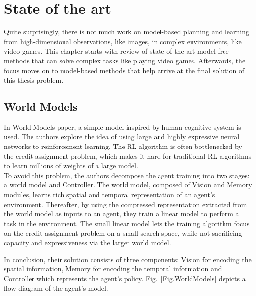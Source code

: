 \section{State of the art}

Quite surprisingly, there is not much work on model-based planning and learning from high-dimensional observations, like images, in complex environments, like video games. This chapter starts with review of state-of-the-art model-free methods that can solve complex tasks like playing video games. Afterwards, the focus moves on to model-based methods that help arrive at the final solution of this thesis problem.

\subsection{World Models} \label{Sec.WorldModels}

In World Models \cite{Algo.WorldModels} paper, a simple model inspired by human cognitive system is used. The authors explore the idea of using large and highly expressive neural networks to reinforcement learning. The RL algorithm is often bottlenecked by the credit assignment problem, which makes it hard for traditional RL algorithms to learn millions of weights of a large model. \\
To avoid this problem, the authors decompose the agent training into two stages: a world model and Controller. The world model, composed of Vision and Memory modules, learns rich spatial and temporal representation of an agent's environment. Thereafter, by using the compressed representation extracted from the world model as inputs to an agent, they train a linear model to perform a task in the environment. The small linear model lets the training algorithm focus on the credit assignment problem on a small search space, while not sacrificing capacity and expressiveness via the larger world model.

In conclusion, their solution consists of three components: Vision for encoding the spatial information, Memory for encoding the temporal information and Controller which represents the agent's policy. Fig.~\ref{Fig.WorldModels} depicts a flow diagram of the agent's model.

